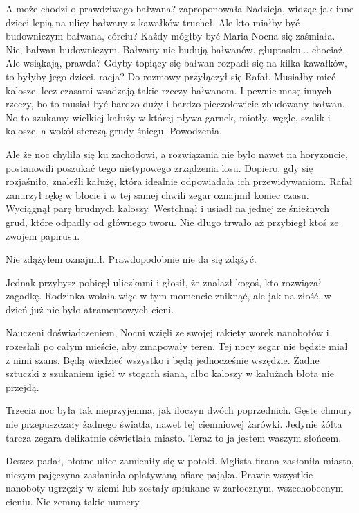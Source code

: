 \begin{dialogue}
	\ds{} A może chodzi o prawdziwego bałwana? \dm{} zaproponowała Nadzieja, widząc jak inne dzieci lepią na ulicy bałwany z kawałków trucheł.
	\ds{} Ale kto miałby być budowniczym bałwana, córciu? Każdy mógłby być \dm{} Maria Nocna się zaśmiała.
	\ds{} Nie, bałwan budowniczym.
	\ds{} Bałwany nie budują bałwanów, głuptasku... chociaż.
	\ds{} Ale wsiąkają, prawda?
	\ds{} Gdyby topiący się bałwan rozpadł się na kilka kawałków, to byłyby jego dzieci, racja? \dm{} Do rozmowy przyłączył się Rafał.
	\ds{} Musiałby mieć kalosze, lecz czasami wsadzają takie rzeczy bałwanom.
	\ds{} I pewnie masę innych rzeczy, bo to musiał być bardzo duży i bardzo pieczołowicie zbudowany bałwan.
	\ds{} No to szukamy wielkiej kałuży w której pływa garnek, miotły, węgle, szalik i kalosze, a wokół sterczą grudy śniegu. Powodzenia.
\end{dialogue}

Ale że noc chyliła się ku zachodowi, a rozwiązania nie było nawet na horyzoncie, postanowili poszukać tego nietypowego zrządzenia losu.
Dopiero, gdy się rozjaśniło, znaleźli kałużę, która idealnie odpowiadała ich przewidywaniom.
Rafał zanurzył rękę w błocie i w tej samej chwili zegar oznajmił koniec czasu.
Wyciągnął parę brudnych kaloszy.
Westchnął i usiadł na jednej ze śnieżnych grud, które odpadły od głównego tworu.
Nie długo trwało aż przybiegł ktoś ze zwojem papirusu.
\begin{dialogue}
	\ds{} Nie zdążyłem \dm{} oznajmił. \dm{} Prawdopodobnie nie da się zdążyć.
\end{dialogue}
Jednak przybysz pobiegł uliczkami i głosił, że znalazł kogoś, kto rozwiązał zagadkę.
Rodzinka wolała więc w tym momencie zniknąć, ale jak na złość, w dzień już nie było atramentowych cieni.

Nauczeni doświadczeniem, Nocni wzięli ze swojej rakiety worek nanobotów i rozesłali po całym mieście, aby zmapowały teren.
Tej nocy zegar nie będzie miał z nimi szans.
Będą wiedzieć wszystko i będą jednocześnie wszędzie.
Żadne sztuczki z szukaniem igieł w stogach siana, albo kaloszy w kałużach błota nie przejdą.

Trzecia noc była tak nieprzyjemna, jak iloczyn dwóch poprzednich.
Gęste chmury nie przepuszczały żadnego światła, nawet tej ciemniowej żarówki.
Jedynie żółta tarcza zegara delikatnie oświetlała miasto.
Teraz to ja jestem waszym słońcem.

Deszcz padał, błotne ulice zamieniły się w potoki.
Mglista firana zasłoniła miasto, niczym pajęczyna zasłaniała oplatywaną ofiarę pająka.
Prawie wszystkie nanoboty ugrzęzły w ziemi lub zostały spłukane w żarłocznym, wszechobecnym cieniu.
Nie zemną takie numery.

